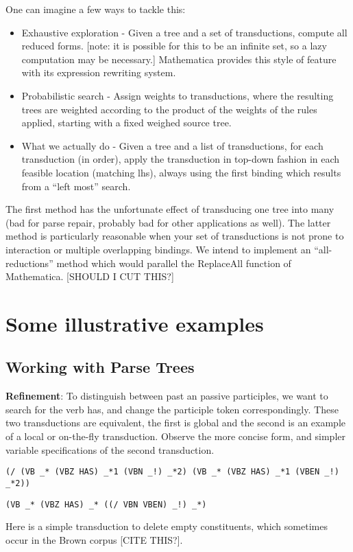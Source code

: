\documentclass[11pt]{article}
\begin{document}
  One can imagine a few ways to tackle this: 
  \begin{itemize}
  \item Exhaustive exploration - Given a tree and a set of transductions, compute all reduced forms.   [note: it is possible for this to be an infinite set, so a lazy computation may be necessary.] Mathematica provides this style of feature with its expression rewriting system.
  \item Probabilistic search - Assign weights to transductions, where the resulting trees are weighted according to the product of the weights of the rules applied, starting with a fixed weighed source tree.
  \item What we actually do - Given a tree and a list of transductions, for each transduction (in order), apply the transduction in top-down fashion in each feasible location (matching lhs), always using the first binding which results from a ``left most'' search.
  \end{itemize}
  The first method has the unfortunate effect of transducing one tree into many (bad for parse repair, probably bad for other applications as well).
  The latter method is particularly reasonable when your set of transductions is not prone to interaction or multiple overlapping bindings.
  We intend to implement an ``all-reductions'' method which would parallel the ReplaceAll function of Mathematica. [SHOULD I CUT THIS?]




\section{Some illustrative examples}
\subsection*{Working with Parse Trees}
{\bf Refinement}:
To distinguish between past an passive participles, we want to search for the verb has, and change the participle token correspondingly.  These two transductions are equivalent, the first is global and the second is an example of a local or on-the-fly transduction.  Observe the more concise form, and simpler variable specifications of the second transduction.

\texttt{(/ (VB \_* (VBZ HAS) \_*1 (VBN \_!) \_*2) (VB \_* (VBZ HAS) \_*1 (VBEN \_!) \_*2))}

\texttt{(VB \_* (VBZ HAS) \_* ((/ VBN VBEN) \_!) \_*)}


Here is a simple transduction to delete empty constituents, which sometimes occur in the Brown corpus [CITE THIS?]. 
\end{document}
